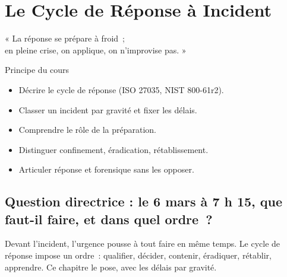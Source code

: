 
\chapter{Le Cycle de Réponse à Incident}
\label{chap:cycle}

\epigraph{%
    « La réponse se prépare à froid~;\\
    en pleine crise, on applique, on n'improvise pas. »%
}{Principe du cours}


\begin{boxobjectifs}
\begin{itemize}
    \item Décrire le cycle de réponse (ISO 27035, NIST 800-61r2).
    \item Classer un incident par gravité et fixer les délais.
    \item Comprendre le rôle de la préparation.
    \item Distinguer confinement, éradication, rétablissement.
    \item Articuler réponse et forensique sans les opposer.
\end{itemize}
\end{boxobjectifs}

\bigskip

\section*{Question directrice : le 6 mars à 7 h 15, que faut-il faire, et dans quel ordre~?}

Devant l'incident, l'urgence pousse à tout faire en même temps. Le cycle de
réponse impose un ordre~: qualifier, décider, contenir, éradiquer, rétablir,
apprendre. Ce chapitre le pose, avec les délais par gravité.

